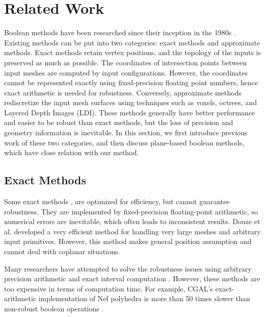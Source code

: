 \section{Related Work}


Boolean methods have been researched since their inception in the 1980s \cite{requicha1985boolean, laidlaw1986constructive}. Existing methods can be put into two categories: exact methods and approximate methods. Exact methods retain vertex positions, and the topology of the inputs is preserved as much as possible. The coordinates of intersection points between input meshes are computed by input configurations. However, the coordinates cannot be represented exactly using fixed-precision floating point numbers, hence exact arithmetic is needed for robustness. Conversely, approximate methods rediscretize the input mesh surfaces using techniques such as voxels, octrees, and Layered Depth Images (LDI). These methods generally have better performance and easier to be robust than exact methods, but the loss of precision and geometry information is inevitable. In this section, we first introduce previous work of these two categories, and then discuss plane-based boolean methods, which have close relation with our method.

\subsection{Exact Methods}


Some exact methods \cite{ogayar2015deferred,douze2015quickcsg,xu2013fast,feito2013fast,updegrove2016boolean}, are optimized for efficiency, but cannot guarantee robustness. They are implemented by fixed-precision floating-point arithmetic, so numerical errors are inevitable, which often leads to inconsistent results.
Douze et al. \cite{douze2015quickcsg} developed a very efficient method for handling very large meshes and arbitrary input primitives. However, this method makes general position assumption and cannot deal with coplanar situations.


Many researchers have attempted to solve the robustness issues using arbitrary precision arithmetic \cite{banerjee1996topologically, fortune1995polyhedral, keyser2004esolid, granados2003boolean, hachenberger2005boolean, zhou2016mesh,barki2015exact} and exact interval computation \cite{fang1993robustness, hu1996robust, segal1990using}. However, these methods are too expensive in terms of computation time. For example, CGAL's \cite{cgal:hk-bonp3-15a} exact-arithmetic implementation \cite{granados2003boolean} of Nef polyhedra \cite{bieri1988elementary} is more than 50 times slower than non-robust boolean operations \cite{bernstein2009fast}.



